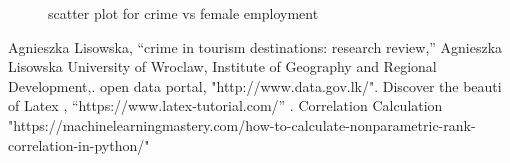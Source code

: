 \documentclass[conference]{IEEEtran}
\begin{document}
\begin{figure}[htbp]
  \centering
    \qquad
    \caption{scatter plot for crime vs female employment}
  \label{scatter2}
\end{figure}

\begin{thebibliography}{00}
 Agnieszka Lisowska, ``crime in tourism destinations: research review,'' Agnieszka Lisowska University of Wroclaw, Institute of Geography and Regional Development,.
 open data portal, "http://www.data.gov.lk/".
 Discover the beauti of Latex , ``https://www.latex-tutorial.com/'' .
 Correlation Calculation "https://machinelearningmastery.com/how-to-calculate-nonparametric-rank-correlation-in-python/"
\end{thebibliography}
\end{document}
